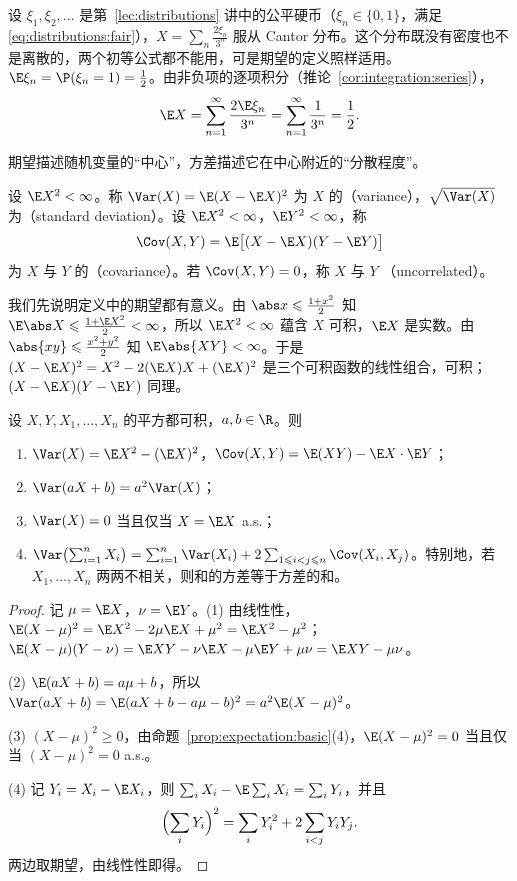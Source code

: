 \begin{example}\label{ex:expectation:cantor}
设 $\xi_1,\xi_2,\dots$ 是第~\ref{lec:distributions} 讲中的公平硬币（$\xi_n\in\{0,1\}$，满足 \eqref{eq:distributions:fair}），$X=\sum_n\frac{2\xi_n}{3^n}$ 服从 Cantor 分布。这个分布既没有密度也不是离散的，两个初等公式都不能用，可是期望的定义照样适用。$\E\xi_n=\P(\xi_n=1)=\frac12$。由非负项的逐项积分（推论~\ref{cor:integration:series}），
\[
\E X=\sum_{n=1}^\infty\frac{2\E\xi_n}{3^n}=\sum_{n=1}^\infty\frac1{3^n}=\frac12 .
\]
\end{example}


期望描述随机变量的“中心”，方差描述它在中心附近的“分散程度”。

\begin{definition}[方差与协方差]\label{def:expectation:variance}
设 $\E X^2<\infty$。称 $\Var(X)=\E(X-\E X)^2$ 为 $X$ 的（variance），$\sqrt{\Var(X)}$ 为（standard deviation）。设 $\E X^2<\infty$，$\E Y^2<\infty$，称
\[
\Cov(X,Y)=\E\bigl[(X-\E X)(Y-\E Y)\bigr]
\]
为 $X$ 与 $Y$ 的（covariance）。若 $\Cov(X,Y)=0$，称 $X$ 与 $Y$ （uncorrelated）。
\end{definition}

我们先说明定义中的期望都有意义。由 $\abs x\leqslant\frac{1+x^2}2$ 知 $\E\abs X\leqslant\frac{1+\E X^2}2<\infty$，所以 $\E X^2<\infty$ 蕴含 $X$ 可积，$\E X$ 是实数。由 $\abs{xy}\leqslant\frac{x^2+y^2}2$ 知 $\E\abs{XY}<\infty$。于是 $(X-\E X)^2=X^2-2(\E X)X+(\E X)^2$ 是三个可积函数的线性组合，可积；$(X-\E X)(Y-\E Y)$ 同理。

\begin{proposition}[方差与协方差的计算公式]\label{prop:expectation:variance}
设 $X,Y,X_1,\dots,X_n$ 的平方都可积，$a,b\in\R$。则
\begin{enumerate}
\item $\Var(X)=\E X^2-(\E X)^2$，$\Cov(X,Y)=\E(XY)-\E X\cdot \E Y$；
\item $\Var(aX+b)=a^2\Var(X)$；
\item $\Var(X)=0$ 当且仅当 $X=\E X$ a.s.；
\item $\Var\bigl(\sum_{i=1}^nX_i\bigr)=\sum_{i=1}^n\Var(X_i)+2\sum_{1\leqslant i<j\leqslant n}\Cov(X_i,X_j)$。特别地，若 $X_1,\dots,X_n$ 两两不相关，则和的方差等于方差的和。
\end{enumerate}
\end{proposition}
\begin{proof}
记 $\mu=\E X$，$\nu=\E Y$。(1) 由线性性，$\E(X-\mu)^2=\E X^2-2\mu \E X+\mu^2=\E X^2-\mu^2$；$\E(X-\mu)(Y-\nu)=\E XY-\nu \E X-\mu \E Y+\mu\nu=\E XY-\mu\nu$。

(2) $\E(aX+b)=a\mu+b$，所以 $\Var(aX+b)=\E(aX+b-a\mu-b)^2=a^2\E(X-\mu)^2$。

(3) $(X-\mu)^2\geqslant0$，由命题~\ref{prop:expectation:basic}(4)，$\E(X-\mu)^2=0$ 当且仅当 $(X-\mu)^2=0$ a.s.。

(4) 记 $Y_i=X_i-\E X_i$，则 $\sum_iX_i-\E\sum_iX_i=\sum_iY_i$，并且
\[
\Bigl(\sum_iY_i\Bigr)^2=\sum_iY_i^2+2\sum_{i<j}Y_iY_j .
\]
两边取期望，由线性性即得。
\end{proof}

